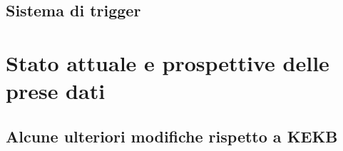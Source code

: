 \subsection{Sistema di trigger}





\newpage




\section{Stato attuale e prospettive delle prese dati}












\subsection{Alcune ulteriori modifiche rispetto a KEKB}

